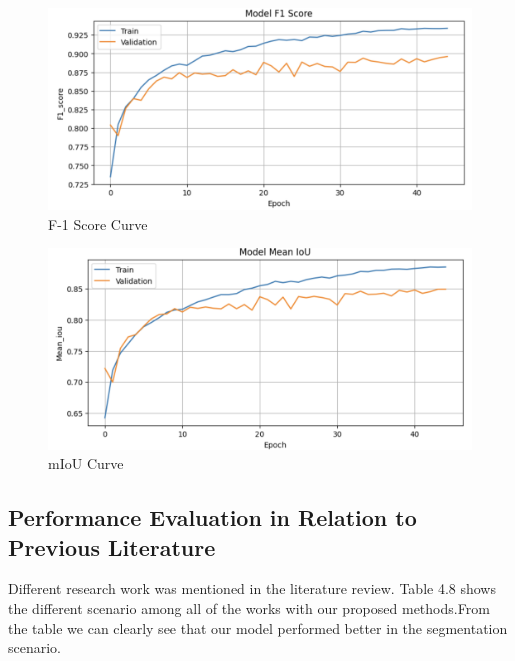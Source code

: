 \begin{figure}[H]
    \centering
    \includegraphics[width=1\textwidth]{figs/F-1 Score.png}
    \caption{F-1 Score Curve}
    \label{F-1}
\end{figure}


\begin{figure}[H]
    \centering
    \includegraphics[width=1\textwidth]{figs/IoU.png}
    \caption{mIoU Curve}
    \label{iou}
\end{figure}






\subsection{Performance Evaluation in Relation to Previous Literature}

Different research work was mentioned in the literature review.
Table 4.8 shows the different scenario among all of the works with our
proposed methods.From the table we can clearly see that our model performed better in the segmentation scenario. \\

